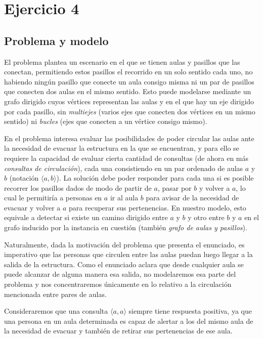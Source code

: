 \section{Ejercicio 4}

\subsection{Problema y modelo}

El problema plantea un escenario en el que se tienen aulas y pasillos que las conectan, permitiendo estos pasillos el recorrido en un solo sentido cada uno, no habiendo ningún pasillo que conecte un aula consigo misma ni un par de pasillos que conecten dos aulas en el mismo sentido. Esto puede modelarse mediante un grafo dirigido cuyos vértices representan las aulas y en el que hay un eje dirigido por cada pasillo, sin \textit{multiejes} (varios ejes que conecten dos vértices en un mismo sentido) ni \textit{bucles} (ejes que conecten a un vértice consigo mismo).

En el problema interesa evaluar las posibilidades de poder circular las aulas ante la necesidad de evacuar la estructura en la que se encuentran, y para ello se requiere la capacidad de evaluar cierta cantidad de consultas (de ahora en más \textit{consultas de circulación}), cada una consistiendo en un par ordenado de aulas $a$ y $b$ (notación $\langle a,b \rangle$). La solución debe poder responder para cada una si es posible recorrer los pasillos dados de modo de partir de $a$, pasar por $b$ y volver a $a$, lo cual le permitiría a personas en $a$ ir al aula $b$ para avisar de la necesidad de evacuar y volver a $a$ para recuperar sus pertenencias. En nuestro modelo, esto equivale a detectar si existe un camino dirigido entre $a$ y $b$ y otro entre $b$ y $a$ en el grafo inducido por la instancia en cuestión (también \textit{grafo de aulas y pasillos}).

Naturalmente, dada la motivación del problema que presenta el enunciado, es imperativo que las personas que circulen entre las aulas puedan luego llegar a la salida de la estructura. Como el enunciado aclara que desde cualquier aula se puede alcanzar de alguna manera esa salida, no modelaremos esa parte del problema y nos concentraremos únicamente en lo relativo a la circulación mencionada entre pares de aulas.

Consideraremos que una consulta $\langle a,a \rangle$ siempre tiene respuesta positiva, ya que una persona en un aula determinada es capaz de alertar a los del mismo aula de la necesidad de evacuar y también de retirar sus pertenencias de ese aula.


